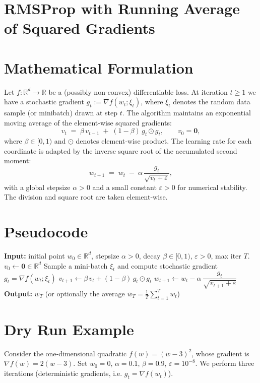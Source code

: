 \documentclass{article}
\newcommand{\R}{\mathbb{R}}
\begin{document}
\section*{RMSProp with Running Average of Squared Gradients}

\section*{Mathematical Formulation}
Let $f:\R^d\rightarrow\R$ be a (possibly non‑convex) differentiable loss.  
At iteration $t\ge 1$ we have a stochastic gradient $g_t:=\nabla f(w_t;\xi_t)$,
where $\xi_t$ denotes the random data sample (or minibatch) drawn at step $t$.
The algorithm maintains an exponential moving average of the element‑wise
squared gradients:
\[
v_t \;=\; \beta\, v_{t-1} \;+\; (1-\beta)\, g_t \odot g_t,
\qquad v_0 = \mathbf{0},
\tag{1}
\]
where $\beta\in[0,1)$ and $\odot$ denotes element‑wise product.
The learning rate for each coordinate is adapted by the inverse square root of
the accumulated second moment:
\[
w_{t+1}\;=\; w_t \;-\; \alpha \, \frac{g_t}{\sqrt{v_t+\varepsilon}},
\tag{2}
\]
with a global stepsize $\alpha>0$ and a small constant $\varepsilon>0$ for
numerical stability.  The division and square root are taken element‑wise.

\section*{Pseudocode}
\begin{algorithm}[H]
\caption{RMSProp (scalar stepsize $\alpha$, decay $\beta$, $\varepsilon$)}
\begin{algorithmic}[1]
\State \textbf{Input:} initial point $w_0\in\R^d$, stepsize $\alpha>0$, decay $\beta\in[0,1)$, $\varepsilon>0$, max iter $T$.
\State $v_0 \gets \mathbf{0}\in\R^d$
    \State Sample a mini‑batch $\xi_t$ and compute stochastic gradient $g_t = \nabla f(w_t;\xi_t)$
    \State $v_{t+1} \gets \beta\, v_{t} + (1-\beta)\, g_t\odot g_t$
    \State $w_{t+1} \gets w_t - \alpha\,\dfrac{g_t}{\sqrt{v_{t+1}+\varepsilon}}$
\EndFor
\State \textbf{Output:} $w_T$ (or optionally the average $\bar w_T=\frac1T\sum_{t=1}^T w_t$)
\end{algorithmic}
\end{algorithm}

\section*{Dry Run Example}
Consider the one‑dimensional quadratic $f(w)=(w-3)^2$, whose gradient is
$\nabla f(w)=2(w-3)$.  Set $w_0=0$, $\alpha=0.1$, $\beta=0.9$, $\varepsilon=10^{-8}$.
We perform three iterations (deterministic gradients, i.e. $g_t=\nabla f(w_t)$).
\end{document}
